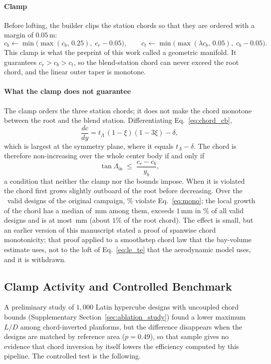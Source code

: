 \paragraph{Clamp} Before lofting, the builder clips the station chords so that they are ordered with a margin of $0.05\,\mathrm{m}$:
\begin{equation}
c_b \leftarrow \min\!\big(\max(c_b,\, 0.25),\; c_r - 0.05\big), \qquad c_t \leftarrow \min\!\big(\max(\lambda c_b,\, 0.05),\; c_b - 0.05\big).
\label{eq:clamp}
\end{equation}
This clamp is what the preprint of this work called a geometric manifold. It guarantees $c_r > c_b > c_t$, so the blend-station chord can never exceed the root chord, and the linear outer taper is monotone.

\paragraph{What the clamp does not guarantee} The clamp orders the three station chords; it does not make the chord monotone between the root and the blend station. Differentiating Eq.~\eqref{eq:chord_cb},
\begin{equation}
\frac{dc}{dy} = t_\Lambda\,(1-\xi)(1-3\xi) - \delta ,
\end{equation}
which is largest at the symmetry plane, where it equals $t_\Lambda - \delta$. The chord is therefore non-increasing over the whole center body if and only if
\begin{equation}
\tan\Lambda_{\mathrm{in}} \;\le\; \frac{c_r - c_b}{y_b},
\label{eq:mono}
\end{equation}
a condition that neither the clamp nor the bounds impose. When it is violated the chord first grows slightly outboard of the root before decreasing. Over the \NvMonoN\ valid designs of the original campaign, \NvMonoViolShare\% violate Eq.~\eqref{eq:mono}; the local growth of the chord has a median of \NvMonoMedian\,mm among them, exceeds $1\,\mathrm{mm}$ in \NvMonoGtOne\% of all valid designs and is at most \NvMonoMax\,mm (about $1\%$ of the root chord). The effect is small, but an earlier version of this manuscript stated a proof of spanwise chord monotonicity; that proof applied to a smoothstep chord law that the bay-volume estimate uses, not to the loft of Eq.~\eqref{eq:le_te} that the aerodynamic model uses, and it is withdrawn.

\subsection{Clamp Activity and Controlled Benchmark}
\label{sec:loft}
A preliminary study of $1{,}000$ Latin hypercube designs with uncoupled chord bounds (Supplementary Section~\ref{sec:ablation_study}) found a lower maximum $L/D$ among chord-inverted planforms, but the difference disappears when the designs are matched by reference area ($p = 0.49$), so that sample gives no evidence that chord inversion by itself lowers the efficiency computed by this pipeline. The controlled test is the following.

